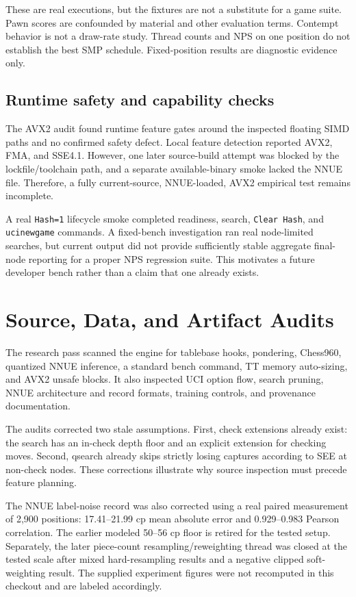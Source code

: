 \documentclass[conference]{IEEEtran}
\newcommand{\code}[1]{\texttt{\small #1}}
\begin{document}
These are real executions, but the fixtures are not a substitute for a game suite. Pawn scores are confounded by material and other evaluation terms. Contempt behavior is not a draw-rate study. Thread counts and NPS on one position do not establish the best SMP schedule. Fixed-position results are diagnostic evidence only.

\subsection{Runtime safety and capability checks}
The AVX2 audit found runtime feature gates around the inspected floating SIMD paths and no confirmed safety defect. Local feature detection reported AVX2, FMA, and SSE4.1. However, one later source-build attempt was blocked by the lockfile/toolchain path, and a separate available-binary smoke lacked the NNUE file. Therefore, a fully current-source, NNUE-loaded, AVX2 empirical test remains incomplete.

A real \code{Hash=1} lifecycle smoke completed readiness, search, \code{Clear Hash}, and \code{ucinewgame} commands. A fixed-bench investigation ran real node-limited searches, but current output did not provide sufficiently stable aggregate final-node reporting for a proper NPS regression suite. This motivates a future developer bench rather than a claim that one already exists.

\section{Source, Data, and Artifact Audits}
The research pass scanned the engine for tablebase hooks, pondering, Chess960, quantized NNUE inference, a standard bench command, TT memory auto-sizing, and AVX2 unsafe blocks. It also inspected UCI option flow, search pruning, NNUE architecture and record formats, training controls, and provenance documentation.

The audits corrected two stale assumptions. First, check extensions already exist: the search has an in-check depth floor and an explicit extension for checking moves. Second, qsearch already skips strictly losing captures according to SEE at non-check nodes. These corrections illustrate why source inspection must precede feature planning.

The NNUE label-noise record was also corrected using a real paired measurement of 2,900 positions: 17.41--21.99 cp mean absolute error and 0.929--0.983 Pearson correlation. The earlier modeled 50--56 cp floor is retired for the tested setup. Separately, the later piece-count resampling/reweighting thread was closed at the tested scale after mixed hard-resampling results and a negative clipped soft-weighting result. The supplied experiment figures were not recomputed in this checkout and are labeled accordingly.
\end{document}
